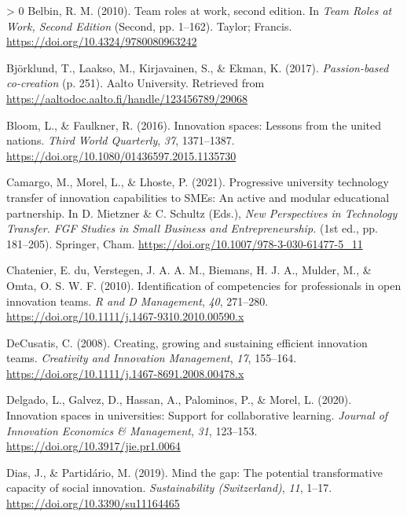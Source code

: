 \documentclass[]{elsarticle} %
\newlength{\cslhangindent}
\newenvironment{CSLReferences}[3] %
 {%
  \setlength{\parindent}{0pt}
  \ifodd #1 \everypar{\setlength{\hangindent}{\cslhangindent}}\ignorespaces\fi
  \ifnum #2 > 0
  \setlength{\parskip}{#2\baselineskip}
  \fi
 }%
 {}
\begin{document}
\hypertarget{refs}{}
\begin{CSLReferences}{1}{0}
\leavevmode\hypertarget{ref-Belbin2010}{}%
Belbin, R. M. (2010). Team roles at work, second edition. In \emph{Team
Roles at Work, Second Edition} (Second, pp. 1--162). Taylor; Francis.
\url{https://doi.org/10.4324/9780080963242}

\leavevmode\hypertarget{ref-Bjorklund2017}{}%
Björklund, T., Laakso, M., Kirjavainen, S., \& Ekman, K. (2017).
\emph{Passion-based co-creation} (p. 251). Aalto University. Retrieved
from \url{https://aaltodoc.aalto.fi/handle/123456789/29068}

\leavevmode\hypertarget{ref-Bloom2016}{}%
Bloom, L., \& Faulkner, R. (2016). Innovation spaces: Lessons from the
united nations. \emph{Third World Quarterly}, \emph{37}, 1371--1387.
\url{https://doi.org/10.1080/01436597.2015.1135730}

\leavevmode\hypertarget{ref-Camargo2021}{}%
Camargo, M., Morel, L., \& Lhoste, P. (2021). Progressive university
technology transfer of innovation capabilities to SMEs: An active and
modular educational partnership. In D. Mietzner \& C. Schultz (Eds.),
\emph{New Perspectives in Technology Transfer. FGF Studies in Small
Business and Entrepreneurship.} (1st ed., pp. 181--205). Springer, Cham.
\url{https://doi.org/10.1007/978-3-030-61477-5_11}

\leavevmode\hypertarget{ref-Chatenier2010}{}%
Chatenier, E. du, Verstegen, J. A. A. M., Biemans, H. J. A., Mulder, M.,
\& Omta, O. S. W. F. (2010). Identification of competencies for
professionals in open innovation teams. \emph{R and D Management},
\emph{40}, 271--280.
\url{https://doi.org/10.1111/j.1467-9310.2010.00590.x}

\leavevmode\hypertarget{ref-DeCusatis2008}{}%
DeCusatis, C. (2008). Creating, growing and sustaining efficient
innovation teams. \emph{Creativity and Innovation Management},
\emph{17}, 155--164.
\url{https://doi.org/10.1111/j.1467-8691.2008.00478.x}

\leavevmode\hypertarget{ref-Delgado2020}{}%
Delgado, L., Galvez, D., Hassan, A., Palominos, P., \& Morel, L. (2020).
Innovation spaces in universities: Support for collaborative learning.
\emph{Journal of Innovation Economics \& Management}, \emph{31},
123--153. \url{https://doi.org/10.3917/jie.pr1.0064}

\leavevmode\hypertarget{ref-Dias2019}{}%
Dias, J., \& Partidário, M. (2019). Mind the gap: The potential
transformative capacity of social innovation. \emph{Sustainability
(Switzerland)}, \emph{11}, 1--17.
\url{https://doi.org/10.3390/su11164465}


\end{CSLReferences}
\end{document}
